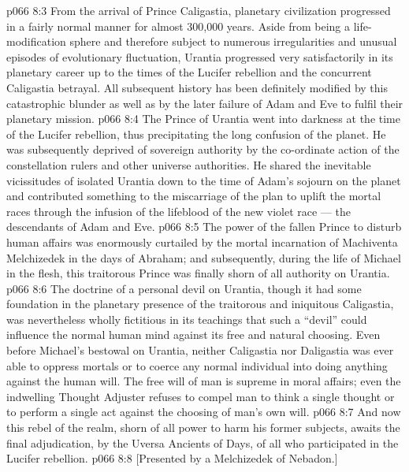 \vs p066 8:3 \pc From the arrival of Prince Caligastia, planetary civilization progressed in a fairly normal manner for almost 300,000 years. Aside from being a life\hyp{}modification sphere and therefore subject to numerous irregularities and unusual episodes of evolutionary fluctuation, Urantia progressed very satisfactorily in its planetary career up to the times of the Lucifer rebellion and the concurrent Caligastia betrayal. All subsequent history has been definitely modified by this catastrophic blunder as well as by the later failure of Adam and Eve to fulfil their planetary mission.
\vs p066 8:4 The Prince of Urantia went into darkness at the time of the Lucifer rebellion, thus precipitating the long confusion of the planet. He was subsequently deprived of sovereign authority by the co\hyp{}ordinate action of the constellation rulers and other universe authorities. He shared the inevitable vicissitudes of isolated Urantia down to the time of Adam’s sojourn on the planet and contributed something to the miscarriage of the plan to uplift the mortal races through the infusion of the lifeblood of the new violet race --- the descendants of Adam and Eve.
\vs p066 8:5 The power of the fallen Prince to disturb human affairs was enormously curtailed by the mortal incarnation of Machiventa Melchizedek in the days of Abraham; and subsequently, during the life of Michael in the flesh, this traitorous Prince was finally shorn of all authority on Urantia.
\vs p066 8:6 \pc The doctrine of a personal devil on Urantia, though it had some foundation in the planetary presence of the traitorous and iniquitous Caligastia, was nevertheless wholly fictitious in its teachings that such a “devil” could influence the normal human mind against its free and natural choosing. Even before Michael’s bestowal on Urantia, neither Caligastia nor Daligastia was ever able to oppress mortals or to coerce any normal individual into doing anything against the human will. The free will of man is supreme in moral affairs; even the indwelling Thought Adjuster refuses to compel man to think a single thought or to perform a single act against the choosing of man’s own will.
\vs p066 8:7 And now this rebel of the realm, shorn of all power to harm his former subjects, awaits the final adjudication, by the Uversa Ancients of Days, of all who participated in the Lucifer rebellion.
\vsetoff
\vs p066 8:8 [Presented by a Melchizedek of Nebadon.]
\quizlink
